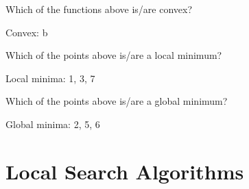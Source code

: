 \begin{questions}

\question Which of the functions above is/are convex?

\begin{solution}[.25in]
Convex: b
\end{solution}


\question Which of the points above is/are a local minimum?

\begin{solution}[.25in]
Local minima:  1, 3, 7
\end{solution}


\question Which of the points above is/are a global minimum?

\begin{solution}[.25in]
Global minima: 2, 5, 6
\end{solution}

\end{questions}

\section{Local Search Algorithms}

